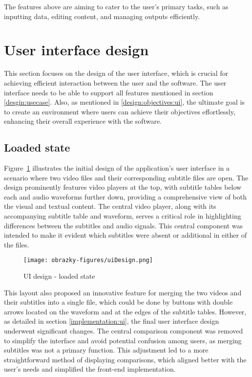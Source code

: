 The features above are aiming to cater to the user's primary tasks, such as inputting data, editing content, and managing outputs efficiently. 

\section{User interface design}
\label{desgin:ui}

This section focuses on the design of the user interface, which is crucial for achieving efficient interaction between the user and the software. The user interface needs to be able to support all features mentioned in section \ref{desgin:usecase}. Also, as mentioned in \ref{design:objectives:ui}, the ultimate goal is to create an environment where users can achieve their objectives effortlessly, enhancing their overall experience with the software.

\subsection{Loaded state}

Figure~\ref{fig:design:ui:1} illustrates the initial design of the application's user interface in a scenario where two video files and their corresponding subtitle files are open. The design prominently features video players at the top, with subtitle tables below each and audio waveforms further down, providing a comprehensive view of both the visual and textual content. The central video player, along with its accompanying subtitle table and waveform, serves a critical role in highlighting differences between the subtitles and audio signals. This central component was intended to make it evident which subtitles were absent or additional in either of the files.

\begin{figure}[ht]
    \centering
    \texttt{[image: obrazky-figures/uiDesign.png]}
    \caption{UI design - loaded state}
    \label{fig:design:ui:1}
\end{figure}

This layout also proposed an innovative feature for merging the two videos and their subtitles into a single file, which could be done by buttons with double arrows located on the waveform and at the edges of the subtitle tables. However, as detailed in section \ref{implementation:ui}, the final user interface design underwent significant changes. The central comparison component was removed to simplify the interface and avoid potential confusion among users, as merging subtitles was not a primary function. This adjustment led to a more straightforward method of displaying comparisons, which aligned better with the user's needs and simplified the front-end implementation.

